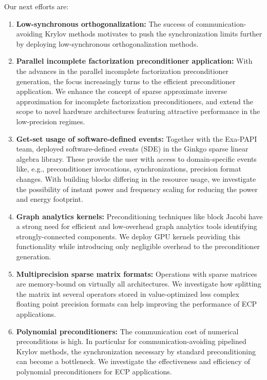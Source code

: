 Our next efforts are:
\begin{enumerate}
	\item \textbf{Low-synchronous orthogonalization:} The success of 
	communication-avoiding Krylov methods motivates to push the synchronization 
	limits further by deploying low-synchronous orthogonalization methods.
	\item \textbf{Parallel incomplete factorization preconditioner 
	application:} With the advances in the parallel incomplete factorization
	preconditioner generation, the focus increasingly turns to the efficient 
	preconditioner application. We enhance the concept of sparse approximate 
	inverse approximation for incomplete factorization preconditioners, and 
	extend the scope to novel hardware architectures featuring attractive 
	performance in the low-precision regimes.
	\item \textbf{Get-set usage of software-defined events:} Together with the 
	Exa-PAPI team, deployed software-defined events (SDE) in the Ginkgo sparse 
	linear algebra library. These provide the user with access to 
	domain-specific events like, e.g., preconditioner invocations, 
	synchronizations, precision format changes. With building blocks differing 
	in the resource usage, we investigate the possibility of instant power and 
	frequency scaling for reducing the power and energy footprint.
	\item \textbf{Graph analytics kernels:} Preconditioning techniques like 
	block Jacobi have a strong need for efficient and low-overhead graph 
	analytics tools identifying strongly-connected components. We deploy GPU 
	kernels providing this functionality while introducing only negligible 
	overhead to the preconditioner generation.
	\item \textbf{Multiprecision sparse matrix formats:} Operations with sparse 
	matrices are memory-bound on virtually all architectures. We investigate 
	how splitting the matrix int several operators stored in value-optimized 
	less complex floating point precision formats can help improving the 
	performance of ECP applications.
	\item \textbf{Polynomial preconditioners:} The communication cost of 
	numerical preconditions is high. In particular for communication-avoiding 
	pipelined Krylov methods, the synchronization necessary by standard 
	preconditioning can become a bottleneck. We investigate the effectiveness 
	and efficiency of polynomial preconditioners for ECP applications.
\end{enumerate}
